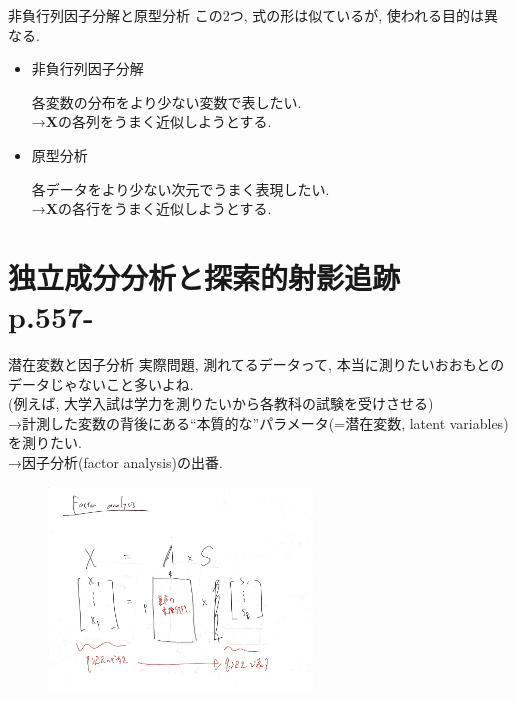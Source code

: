 \documentclass[dvipdfmx,8pt]{beamer}
\begin{document}
  \begin{frame}{非負行列因子分解と原型分析}
    この2つ, 式の形は似ているが, 使われる目的は異なる.
    \begin{itemize}
      \item 非負行列因子分解

        各変数の分布をより少ない変数で表したい. \\
        →$\textbf{X}$の各列をうまく近似しようとする.

      \item 原型分析

        各データをより少ない次元でうまく表現したい. \\
        →$\textbf{X}$の各行をうまく近似しようとする.
    \end{itemize}
  \end{frame}
  \section{独立成分分析と探索的射影追跡\\p.557-}
  \begin{frame}{潜在変数と因子分析}
    実際問題, 測れてるデータって, 本当に測りたいおおもとのデータじゃないこと多いよね. \\
    (例えば, 大学入試は学力を測りたいから各教科の試験を受けさせる)\\
    →計測した変数の背後にある``本質的な''パラメータ(=潜在変数, latent variables)を測りたい. \\
    →因子分析(factor analysis)の出番.
    \begin{figure}[htb]
      \centering
      \includegraphics[width=7cm,clip]{images/fa-overview.jpg}
    \end{figure}
  \end{frame}
\end{document}
